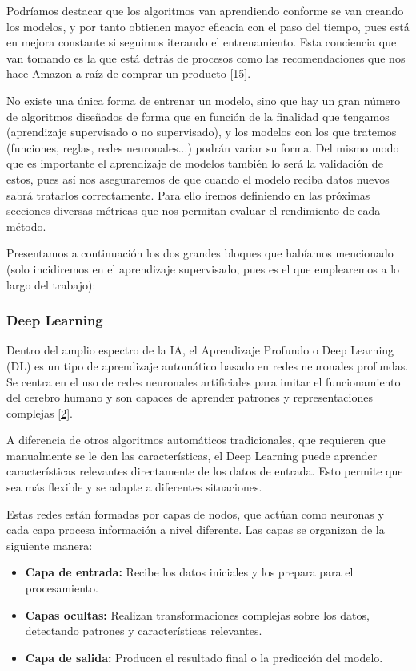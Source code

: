 \documentclass[11pt, a4paper]{article}
\numberwithin{equation}{section}
\begin{document}
Podríamos destacar que los algoritmos van aprendiendo conforme se van creando los modelos, y por tanto obtienen mayor eficacia con el paso del tiempo, pues está en mejora constante si seguimos iterando el entrenamiento. Esta conciencia que van tomando es la que está detrás de procesos como las recomendaciones que nos hace Amazon a raíz de comprar un producto \hyperlink{ref:15}{[15]}.

No existe una única forma de entrenar un modelo, sino que hay un gran número de algoritmos diseñados de forma que en función de la finalidad que tengamos (aprendizaje supervisado o no supervisado), y los modelos con los que tratemos (funciones, reglas, redes neuronales...) podrán variar su forma. Del mismo modo que es importante el aprendizaje de modelos también lo será la validación de estos, pues así nos aseguraremos de que cuando el modelo reciba datos nuevos sabrá tratarlos correctamente. Para ello iremos definiendo en las próximas secciones diversas métricas que nos permitan evaluar el rendimiento de cada método.

Presentamos a continuación los dos grandes bloques que habíamos mencionado (solo incidiremos en el aprendizaje supervisado, pues es el que emplearemos a lo largo del trabajo):

\subsubsection{Deep Learning}

Dentro del amplio espectro de la IA, el Aprendizaje Profundo o Deep Learning (DL) es un tipo de aprendizaje automático basado en redes neuronales profundas. Se centra en el uso de redes neuronales artificiales para imitar el funcionamiento del cerebro humano y son capaces de aprender patrones y representaciones complejas \hyperlink{ref:2}{[2]}.

A diferencia de otros algoritmos automáticos tradicionales, que requieren que manualmente se le den las características, el Deep Learning puede aprender características relevantes directamente de los datos de entrada. Esto permite que sea más flexible y se adapte a diferentes situaciones.

Estas redes están formadas por capas de nodos, que actúan como neuronas y cada capa procesa información a nivel diferente. Las capas se organizan de la siguiente manera:

\begin{itemize}
\item \textbf{Capa de entrada:} Recibe los datos iniciales y los prepara para el procesamiento.
\item \textbf{Capas ocultas:} Realizan transformaciones complejas sobre los datos, detectando patrones y características relevantes.
\item \textbf{Capa de salida:} Producen el resultado final o la predicción del modelo.
\end{itemize}
\end{document}
